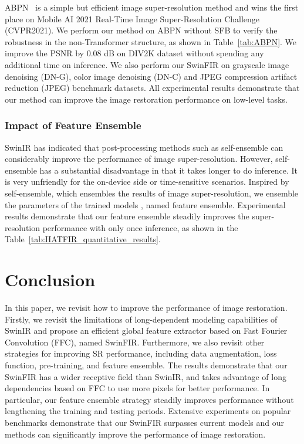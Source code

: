 \documentclass[10pt,twocolumn,letterpaper]{article}
\begin{document}
ABPN~\cite{du2021anchor} is a simple but efficient image super-resolution method and wins the first place on Mobile AI 2021 Real-Time Image Super-Resolution Challenge (CVPR2021). We perform our method on ABPN without SFB to verify the robustness in the non-Transformer structure, as shown in Table~\ref{tab:ABPN}. We improve the PSNR by 0.08 dB on DIV2K dataset without spending any additional time on inference. We also perform our SwinFIR on grayscale image denoising (DN-G), color image denoising (DN-C) and JPEG compression artifact reduction (JPEG) benchmark datasets. All experimental results demonstrate that our method can improve the image restoration performance on low-level tasks.


\subsubsection{Impact of Feature Ensemble}
SwinIR has indicated that post-processing methods such as self-ensemble can considerably improve the performance of image super-resolution. However, self-ensemble has a substantial disadvantage in that it takes longer to do inference. 
It is very unfriendly for the on-device side or time-sensitive scenarios. 
Inspired by self-ensemble, which ensembles the results of image super-resolution, we ensemble the parameters of the trained models , named feature ensemble. 
Experimental results demonstrate that our feature ensemble steadily improves the super-resolution performance with only once inference, as shown in the Table~\ref{tab:HATFIR_quantitative_results}. 





 \section{Conclusion}
In this paper, we revisit how to improve the performance of image restoration. Firstly, we revisit the limitations of long-dependent modeling capabilities of SwinIR and propose an efficient global feature extractor based on Fast Fourier Convolution (FFC), named SwinFIR. Furthermore, we also revisit other strategies for improving SR performance, including data augmentation, loss function, pre-training, and feature ensemble. The results demonstrate that our SwinFIR has a wider receptive field than SwinIR, and takes advantage of long dependencies based on FFC to use more pixels for better performance. In particular, our feature ensemble strategy steadily improves performance without lengthening the training and testing periods. Extensive experiments on popular benchmarks demonstrate that our SwinFIR surpasses current models and our methods can significantly improve the performance of image restoration. 
{\small


}
\end{document}
